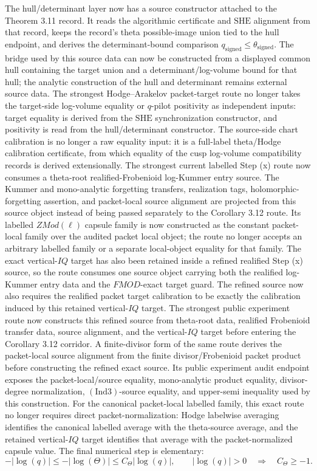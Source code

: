 \documentclass[11pt]{article}
\newcommand{\Ind}{\ensuremath{\mathrm{Ind}}}
\newcommand{\SHE}{\ensuremath{\mathrm{SHE}}}
\theoremstyle{plain}
\theoremstyle{definition}
\theoremstyle{remark}
\begin{document}
The hull/determinant layer now has a source constructor attached to the
Theorem 3.11 record.  It reads the algorithmic certificate and \(\SHE\)
alignment from that record, keeps the record's theta possible-image union tied
to the hull endpoint, and derives the determinant-bound comparison
\(q_{\mathrm{signed}}\le\theta_{\mathrm{signed}}\).  The bridge used by this
source data can now be constructed from a displayed common hull containing the
target union and a determinant/log-volume bound for that hull; the analytic
construction of the hull and determinant remains external source data.
The strongest Hodge--Arakelov packet-target route no longer takes the
target-side log-volume equality or \(q\)-pilot positivity as independent
inputs: target equality is derived from the \(\SHE\) synchronization constructor,
and positivity is read from the hull/determinant constructor.  The source-side
chart calibration is no longer a raw equality input: it is a full-label
theta/Hodge calibration certificate, from which equality of the cusp
log-volume compatibility records is derived extensionally.
The strongest current labelled Step (x) route now consumes a theta-root
realified-Frobenioid log-Kummer entry source.  The Kummer and mono-analytic
forgetting transfers, realization tags, holomorphic-forgetting assertion, and
packet-local source alignment are projected from this source object instead of
being passed separately to the Corollary 3.12 route.
Its labelled \(ZMod(\ell)\) capsule family is now constructed as the constant
packet-local family over the audited packet local object; the route no longer
accepts an arbitrary labelled family or a separate local-object equality for
that family.
The exact vertical-\(IQ\) target has also been retained inside a refined
realified Step (x) source, so the route consumes one source object carrying both
the realified log-Kummer entry data and the \(FMOD\)-exact target guard.
The refined source now also requires the realified packet target calibration to
be exactly the calibration induced by this retained vertical-\(IQ\) target.
The strongest public experiment route now constructs this refined source from
theta-root data, realified Frobenioid transfer data, source alignment, and the
vertical-\(IQ\) target before entering the Corollary 3.12 corridor.
A finite-divisor form of the same route derives the packet-local source
alignment from the finite divisor/Frobenioid packet product before constructing
the refined exact source.
Its public experiment audit endpoint exposes the packet-local/source equality,
mono-analytic product equality, divisor-degree normalization,
\((\Ind3)\)-source equality, and upper-semi inequality used by this
construction.
For the canonical packet-local labelled family, this exact route no longer
requires direct packet-normalization: Hodge labelwise averaging identifies the
canonical labelled average with the theta-source average, and the retained
vertical-\(IQ\) target identifies that average with the packet-normalized
capsule value.
The final numerical step is elementary:
\[
  -|\log(q)|\le -|\log(\Theta)|
  \le C_\Theta|\log(q)|,\qquad |\log(q)|>0
  \quad\Longrightarrow\quad C_\Theta\ge -1 .
\]
\end{document}
